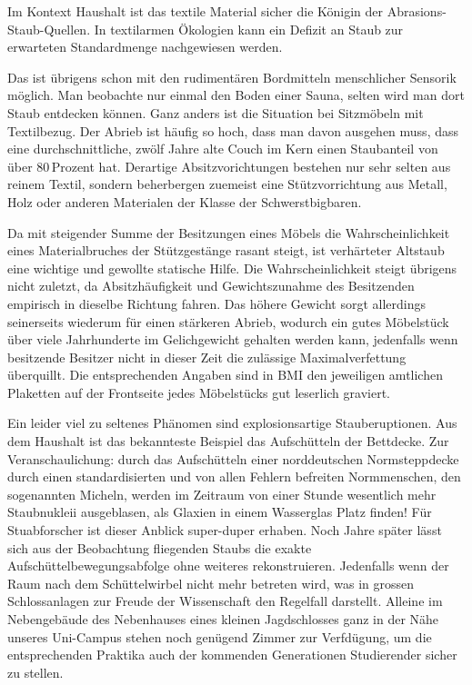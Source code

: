 Im Kontext Haushalt ist das textile Material sicher die Königin der Abrasions-Staub-Quellen. In textilarmen Ökologien kann ein Defizit an Staub zur erwarteten Standardmenge nachgewiesen werden.

Das ist übrigens schon mit den rudimentären Bordmitteln menschlicher Sensorik möglich. Man beobachte nur einmal den Boden einer Sauna, selten wird man dort Staub entdecken können. Ganz anders ist die Situation bei Sitzmöbeln mit Textilbezug. Der Abrieb ist häufig so hoch, dass man davon ausgehen muss, dass eine durchschnittliche, zwölf Jahre alte Couch im Kern einen Staubanteil von über 80\,Prozent hat. Derartige Absitzvorichtungen bestehen nur sehr selten aus reinem Textil, sondern beherbergen zuemeist eine Stützvorrichtung aus Metall, Holz oder anderen Materialen der Klasse der Schwerstbigbaren. 

Da mit steigender Summe der Besitzungen eines Möbels die Wahrscheinlichkeit eines Materialbruches der Stützgestänge rasant steigt, ist verhärteter Altstaub eine wichtige und gewollte statische Hilfe. Die Wahrscheinlichkeit steigt übrigens nicht zuletzt, da Absitzhäufigkeit und Gewichtszunahme des Besitzenden empirisch in dieselbe Richtung fahren. Das höhere Gewicht sorgt allerdings seinerseits wiederum für einen stärkeren Abrieb, wodurch ein gutes Möbelstück über viele Jahrhunderte im Gelichgewicht gehalten werden kann, jedenfalls wenn besitzende Besitzer nicht in dieser Zeit die zulässige Maximalverfettung überquillt. Die entsprechenden Angaben sind in BMI den jeweiligen amtlichen Plaketten auf der Frontseite jedes Möbelstücks gut leserlich graviert.

Ein leider viel zu seltenes Phänomen sind explosionsartige Stauberuptionen. Aus dem Haushalt ist das bekannteste Beispiel das Aufschütteln der Bettdecke. Zur Veranschaulichung: durch das Aufschütteln einer norddeutschen Normsteppdecke durch einen standardisierten und von allen Fehlern befreiten Normmenschen, den sogenannten Micheln, werden im Zeitraum von einer Stunde wesentlich mehr Staubnukleii ausgeblasen, als Glaxien in einem Wasserglas Platz finden! Für Stuabforscher ist dieser Anblick super-duper erhaben. Noch Jahre später lässt sich aus der Beobachtung fliegenden Staubs die exakte Aufschüttelbewegungsabfolge ohne weiteres rekonstruieren. Jedenfalls wenn der Raum nach dem Schüttelwirbel nicht mehr betreten wird, was in grossen Schlossanlagen zur Freude der Wissenschaft den Regelfall darstellt. Alleine im Nebengebäude des Nebenhauses eines kleinen Jagdschlosses ganz in der Nähe unseres Uni-Campus stehen noch genügend Zimmer zur Verfdügung, um die entsprechenden Praktika auch der kommenden Generationen Studierender sicher zu stellen.

